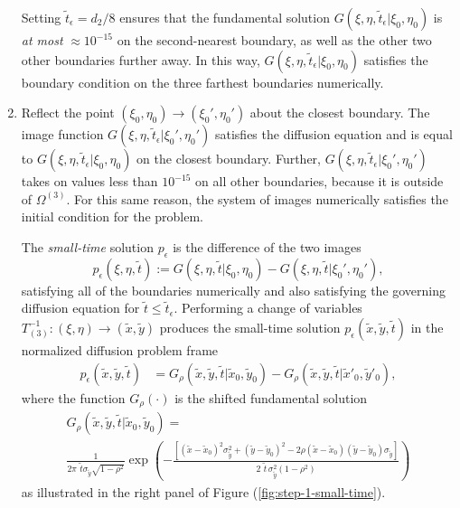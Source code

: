 \begin{enumerate}
  Setting $\tilde{t}_\epsilon = d_2/8$ ensures that the fundamental
  solution $G(\xi,\eta,\tilde{t}_\epsilon | \xi_0, \eta_0)$ is
  \textit{at most} $\approx 10^{-15}$ on the second-nearest boundary,
  as well as the other two other boundaries further away. In this way,
  $G(\xi,\eta,\tilde{t}_\epsilon | \xi_0, \eta_0)$ satisfies the
  boundary condition on the three farthest boundaries numerically.

\item Reflect the point $(\xi_0, \eta_0) \to (\xi_0', \eta_0')$ about
  the closest boundary. The image function
  $G(\xi,\eta,\tilde{t}_\epsilon | \xi_0', \eta_0')$ satisfies the
  diffusion equation and is equal to
  $G(\xi,\eta,\tilde{t}_\epsilon | \xi_0, \eta_0)$ on the closest
  boundary. Further,
  $G(\xi,\eta,\tilde{t}_\epsilon | \xi_0', \eta_0')$ takes on values
  less than $10^{-15}$ on all other boundaries, because it is outside
  of $\Omega^{(3)}$. For this same reason, the system of images numerically
  satisfies the initial condition for the problem.

  The \textit{small-time} solution $p_\epsilon$ is the difference of the two images
  \[
    p_\epsilon(\xi,\eta,\tilde{t}) := G(\xi,\eta,\tilde{t} | \xi_0,
    \eta_0) - G(\xi,\eta,\tilde{t} | \xi_0', \eta_0'),
  \]
  satisfying all of the boundaries numerically and also satisfying the
  governing diffusion equation for
  $\tilde{t} \leq \tilde{t}_\epsilon$. Performing a change of
  variables $T_{(3)}^{-1}: (\xi,\eta) \to (\tilde{x}, \tilde{y})$
  produces the small-time solution
  $p_\epsilon(\tilde{x},\tilde{y},\tilde{t})$ in the normalized
  diffusion problem frame
  \begin{align}
    p_\epsilon(\tilde{x}, \tilde{y}, \tilde{t}) &= G_\rho(\tilde{x}, \tilde{y}, \tilde{t} | \tilde{x}_0, \tilde{y}_0) - G_\rho(\tilde{x}, \tilde{y}, \tilde{t} | \tilde{x}'_0, \tilde{y}'_0), \label{eq:p-epsilon}
  \end{align}
  where the function $G_\rho(\cdot)$ is the shifted fundamental solution
  \begin{multline}
    G_\rho(\tilde{x}, \tilde{y}, \tilde{t} | \tilde{x}_0, \tilde{y}_0) = \nonumber \\
    \frac{1}{2\pi\,\, \tilde{t}\sigma_{\tilde{y}}\sqrt{1-\rho^2}} \exp\left( -\frac{\left[ \left(\tilde{x}-\tilde{x}_0\right)^2 \sigma_{\tilde{y}}^2 + \left(\tilde{y}-\tilde{y}_0\right)^2 - 2\rho(\tilde{x}-\tilde{x}_0)(\tilde{y}-\tilde{y}_0)\sigma_{\tilde{y}} \right]}{2\,\,\tilde{t}\, \sigma_{\tilde{y}}^2 (1-\rho^2)} \right) \label{eq:Gfundamental}
    \end{multline}
    as illustrated in the right panel of Figure
    (\ref{fig:step-1-small-time}).
\end{enumerate}

